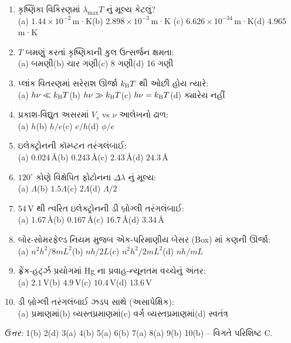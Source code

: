 \begin{mcqbox}
\begin{enumerate}
  \item કૃષ્ણિકા વિકિરણમાં $\lambda_{\max}T$ નું મૂલ્ય કેટલું?\\
    (a) $1.44\times10^{-2}$\,m·K\quad (b) $2.898\times10^{-3}$\,m·K\quad
    (c) $6.626\times10^{-34}$\,m·K\quad (d) $4.965$\,m·K
  \item $T$ બમણું કરતાં કૃષ્ણિકાની કુલ ઉત્સર્જન ક્ષમતા:\\
    (a) બમણી\quad (b) ચાર ગણી\quad (c) 8 ગણી\quad (d) 16 ગણી
  \item પ્લાંક વિતરણમાં સરેરાશ ઊર્જા $k_{\mathrm{B}} T$ થી ઓછી હોય ત્યારે:\\
    (a) $h\nu\ll k_{\mathrm{B}} T$\quad (b) $h\nu\gg k_{\mathrm{B}} T$\quad (c) $h\nu=k_{\mathrm{B}} T$\quad (d) ક્યારેય નહીં
  \item પ્રકાશ-વિદ્યુત અસરમાં $V_s$ vs $\nu$ આલેખનો ઢાળ:\\
    (a) $h$\quad (b) $h/e$\quad (c) $e/h$\quad (d) $\phi/e$
  \item ઇલેક્ટ્રોનની કૉમ્પ્ટન તરંગલંબાઈ:\\
    (a) $0.024\,$\AA\quad (b) $0.243\,$\AA\quad (c) $2.43\,$\AA\quad (d) $24.3\,$\AA
  \item $120^\circ$ કોણે વિક્ષેપિત ફોટોનના $\Delta\lambda$ નું મૂલ્ય:\\
    (a) $\Lambda$\quad (b) $1.5\Lambda$\quad (c) $2\Lambda$\quad (d) $\Lambda/2$
  \item $54\,$V થી ત્વરિત ઇલેક્ટ્રોનની ડી બ્રોગ્લી તરંગલંબાઈ:\\
    (a) $1.67\,$\AA\quad (b) $0.167\,$\AA\quad (c) $16.7\,$\AA\quad (d) $3.34\,$\AA
  \item બોર-સોમરફેલ્ડ નિયમ મુજબ એક-પરિમાણીય બેસર (Box) માં કણની ઊર્જા:\\
    (a) $n^{2}h^{2}/8mL^{2}$\quad (b) $nh/2L$\quad (c) $n^{2}h^{2}/2mL^{2}$\quad (d) $nh/mL$
  \item ફ્રેંક-હર્ટ્ઝ પ્રયોગમાં Hg ના પ્રવાહ-ન્યૂનતમ વચ્ચેનું અંતર:\\
    (a) $2.1\,$V\quad (b) $4.9\,$V\quad (c) $10.4\,$V\quad (d) $13.6\,$V
  \item ડી બ્રોગ્લી તરંગલંબાઈ ઝડપ સાથે (અસાપેક્ષિક):\\
    (a) પ્રમાણમાં\quad (b) વ્યસ્તપ્રમાણમાં\quad (c) વર્ગ વ્યસ્તપ્રમાણમાં\quad (d) સ્વતંત્ર
\end{enumerate}
\textit{ઉત્તર:} 1(b) 2(d) 3(a) 4(b) 5(a) 6(b) 7(a) 8(a) 9(b) 10(b) -- વિગતે પરિશિષ્ટ C.
\end{mcqbox}
